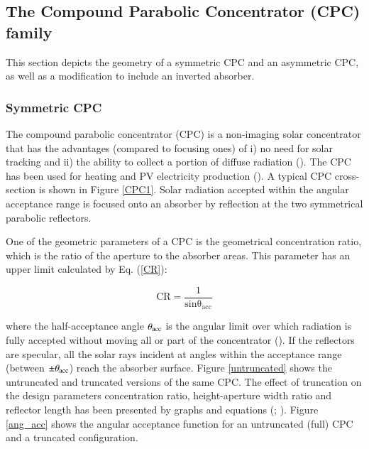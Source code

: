 \subsection{The Compound Parabolic Concentrator (CPC) family}

This section depicts the geometry of a symmetric CPC and an asymmetric CPC, as well as a modification to include an inverted absorber.

\subsubsection{Symmetric CPC} 

The compound parabolic concentrator (CPC) is a non-imaging solar concentrator that has the advantages (compared to focusing ones) of i) no need for solar tracking and ii) the ability to collect a portion of diffuse radiation (\cite{Winston1974}). The CPC has been used for heating and PV electricity production (\cite{Jaaz2017}). A typical CPC cross-section is shown in Figure \ref{CPC1}. Solar radiation accepted within the angular acceptance range is focused onto an absorber by reflection at the two symmetrical parabolic reflectors. 


One of the geometric parameters of a CPC is the geometrical concentration ratio, which is the ratio of the aperture to the absorber areas. This parameter has an upper limit calculated by Eq. (\ref{CR}):

\begin{equation}
	\mathrm{CR = \frac{1}{sin\theta_{acc}}}
	\label{CR}
\end{equation}

\noindent where the half-acceptance angle $\rm{\theta_{acc}}$ is the angular limit over which radiation is fully accepted without moving all or part of the concentrator (\cite{Rabl1976a}). If the reflectors are specular, all the solar rays incident at angles within the acceptance range (between $\pm \theta_{\rm{acc}}$) reach the absorber surface. Figure \ref{untruncated} shows the untruncated and truncated versions of the same CPC. The effect of truncation on the design parameters concentration ratio, height-aperture width ratio and reflector length has been presented by graphs and equations (\cite{McIntire1979}; \cite{Rabl1976}). Figure \ref{ang_acc} shows the angular acceptance function for an untruncated (full) CPC and a truncated configuration.

